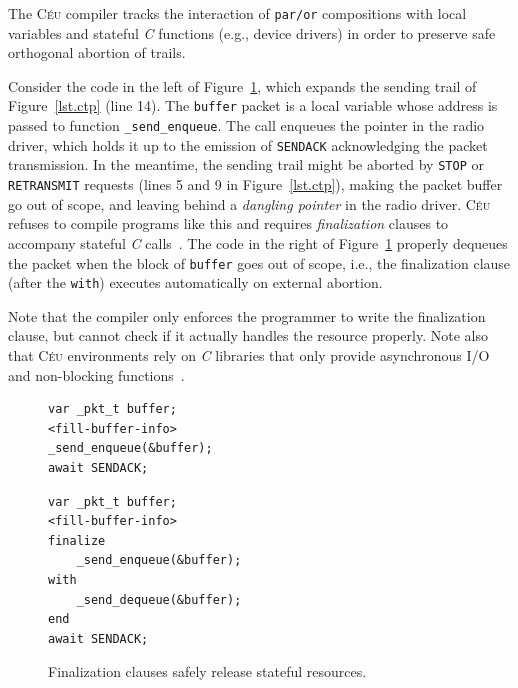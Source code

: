 \documentclass{sigplanconf}
\newcommand{\CEU}{\textsc{C\'{e}u}\xspace}
\newcommand{\code}[1] {{\small{\texttt{#1}}}}
\newcommand{\1}{\;}
\newcommand{\2}{\;\;}
\newcommand{\3}{\;\;\;}
\newcommand{\5}{\;\;\;\;\;}
\begin{document}
%
The \CEU compiler tracks the interaction of \code{par/or} compositions with 
local variables and stateful \emph{C} functions (e.g., device drivers) in order 
to preserve safe orthogonal abortion of trails.
%

Consider the code in the left of Figure~\ref{lst.fin}, which expands the 
sending trail of Figure~\ref{lst.ctp} (line 14).
%
The \code{buffer} packet is a local variable whose address is passed to 
function \code{\_send\_enqueue}.
The call enqueues the pointer in the radio driver, which holds it up to the 
emission of \code{SENDACK} acknowledging the packet transmission.
%
In the meantime, the sending trail might be aborted by \code{STOP} or 
\code{RETRANSMIT} requests (lines 5 and 9 in Figure~\ref{lst.ctp}), making the 
packet buffer go out of scope, and leaving behind a \emph{dangling pointer} in 
the radio driver.
%
\CEU refuses to compile programs like this and requires \emph{finalization} 
clauses to accompany stateful \emph{C} calls~\cite{ceu.sensys13}.
The code in the right of Figure~\ref{lst.fin} properly dequeues the packet when
the block of \code{buffer} goes out of scope, i.e., the finalization clause 
(after the \code{with}) executes automatically on external abortion.

Note that the compiler only enforces the programmer to write the finalization 
clause, but cannot check if it actually handles the resource properly.
%
Note also that \CEU environments rely on \emph{C} libraries that only provide 
asynchronous I/O and non-blocking functions~\cite{ceu.sensys13}.

\begin{figure}[t]
\begin{minipage}[t]{0.45\linewidth}
\begin{lstlisting}
var _pkt_t buffer;
<fill-buffer-info>
_send_enqueue(&buffer);
await SENDACK;
\end{lstlisting}
\end{minipage}
%
\begin{minipage}[t]{0.50\linewidth}
\begin{lstlisting}
var _pkt_t buffer;
<fill-buffer-info>
finalize
    _send_enqueue(&buffer);
with
    _send_dequeue(&buffer);
end
await SENDACK;
\end{lstlisting}
\end{minipage}
\caption{ Finalization clauses safely release stateful resources.
\label{lst.fin}
}
\end{figure}
\end{document}
